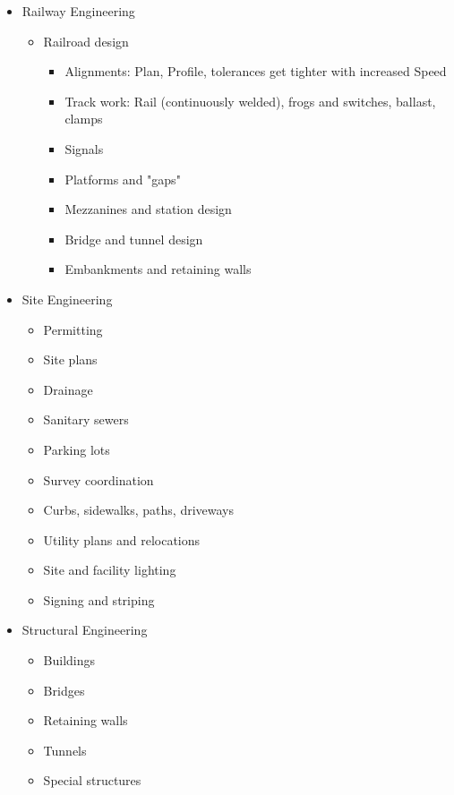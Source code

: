 \documentclass{article}
\begin{document}
\begin{itemize}
\begin{itemize}
        \item Railway Engineering
        \begin{itemize}
            \item Railroad design
            \begin{itemize}
                \item Alignments: Plan, Profile, tolerances get tighter with increased Speed
                \item Track work: Rail (continuously welded), frogs and switches, ballast, clamps
                \item Signals
                \item Platforms and "gaps"
                \item Mezzanines and station design
                \item Bridge and tunnel design
                \item Embankments and retaining walls
            \end{itemize}
        \end{itemize}
        \item Site Engineering
        \begin{itemize}
            \item Permitting
            \item Site plans
            \item Drainage
            \item Sanitary sewers
            \item Parking lots
            \item Survey coordination
            \item Curbs, sidewalks, paths, driveways
            \item Utility plans and relocations
            \item Site and facility lighting
            \item Signing and striping
        \end{itemize}
        \item Structural Engineering
        \begin{itemize}
            \item Buildings
            \item Bridges
            \item Retaining walls
            \item Tunnels
            \item Special structures
            \begin{itemize}

\end{itemize}
\end{itemize}
\end{itemize}
\end{itemize}
\end{document}
